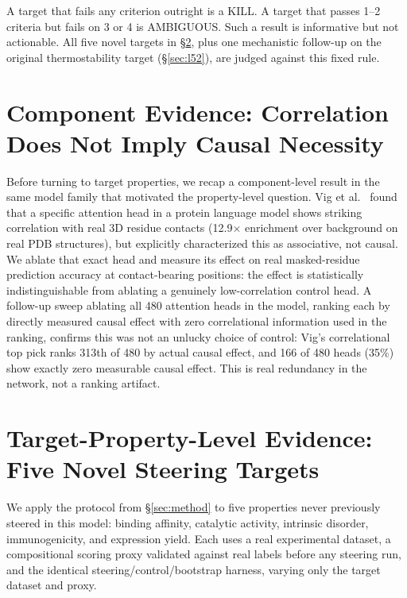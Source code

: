 \documentclass{article}
\begin{document}
A target that fails any criterion outright is a KILL. A target
that passes 1--2 criteria but fails on 3 or 4 is
AMBIGUOUS. Such a result is informative but not actionable. All five novel
targets in \S\ref{sec:sweep}, plus one mechanistic follow-up on the
original thermostability target (\S\ref{sec:l52}), are judged against
this fixed rule.

\section{Component Evidence: Correlation Does Not Imply Causal Necessity}
\label{sec:component}

Before turning to target properties, we recap a component-level result
in the same model family that motivated the property-level question.
Vig et al.\ \citep{vig2021bertology} found that a specific attention
head in a protein language model shows striking correlation with real
3D residue contacts (12.9$\times$ enrichment over background on real PDB
structures), but explicitly characterized this as associative, not
causal. We ablate that exact head and measure its effect on real
masked-residue prediction accuracy at contact-bearing positions: the
effect is statistically indistinguishable from ablating a genuinely
low-correlation control head. A follow-up sweep ablating all 480
attention heads in the model, ranking each by directly measured causal
effect with zero correlational information used in the ranking, confirms
this was not an unlucky choice of control: Vig's correlational top pick
ranks 313th of 480 by actual causal effect, and 166 of 480 heads (35\%)
show exactly zero measurable causal effect. This is real redundancy in
the network, not a ranking artifact.

\section{Target-Property-Level Evidence: Five Novel Steering Targets}
\label{sec:sweep}

We apply the protocol from \S\ref{sec:method} to five properties never
previously steered in this model: binding affinity, catalytic activity,
intrinsic disorder, immunogenicity, and expression yield. Each uses a
real experimental dataset, a compositional scoring proxy validated
against real labels before any steering run, and the identical
steering/control/bootstrap harness, varying only the target dataset and
proxy.
\end{document}
